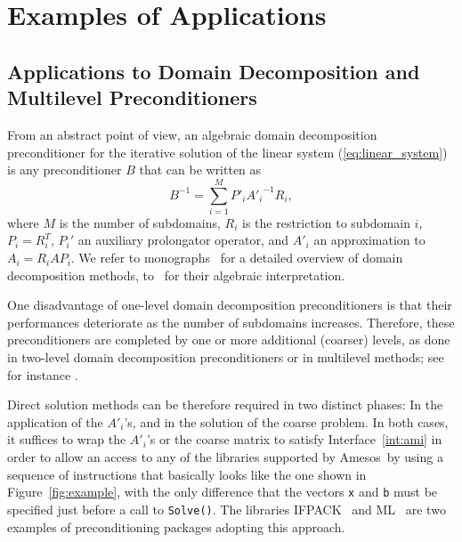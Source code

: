 \documentclass[acmtocl]{acmtrans2m}
\newcommand{\amesos}{{\sc Amesos}}
\begin{document}
\section{Examples of Applications}
\label{sec:example}

\subsection{Applications to Domain Decomposition and Multilevel Preconditioners}
\label{sec:preconditioner}

From an abstract point of view, an algebraic domain decomposition
preconditioner for the iterative solution of the linear system
(\ref{eq:linear_system})
is any preconditioner $B$ that can be written as
\begin{equation}
\label{eq:prec}
B^{-1} = \sum_{i=1}^M P'_i {A'_i}^{-1} R_i,
\end{equation}
where
$M$ is the number of subdomains, $R_i$ is the restriction to subdomain $i$,
  $P_i = R_i^T$, $P_i'$ an auxiliary prolongator operator, and 
$A'_i$ an approximation to $A_i = R_i A P_i$.  We refer to 
monographs~\cite{QV2,smith96parallel} for a detailed
overview of domain decomposition methods, to~\cite{saad96iterative} for their
algebraic interpretation.

One disadvantage of one-level domain decomposition preconditioners is that
their performances deteriorate as the number of subdomains increases.
Therefore, these preconditioners are completed by one or more additional
(coarser) levels, as done in two-level domain decomposition preconditioners or
in multilevel methods; 
see for instance \cite{brandt.classic,hack.book}. 

Direct solution methods can be therefore required in two distinct phases: In the application of
the $A'_i$'s, and in the solution of the coarse problem. In both cases, it
suffices to wrap the $A'_i$'s or the coarse matrix to satisfy
Interface~\ref{int:ami} in order to allow an access to any of the libraries
supported by \amesos\ by using a sequence of instructions that basically looks
like the one shown in Figure~\ref{fig:example}, with the only difference that
the vectors \verb!x! and \verb!b! must be specified just before a call to
\verb!Solve()!.  The libraries IFPACK~\cite{ifpack-guide} and
ML~\cite{ml-guide} are two examples of preconditioning packages adopting this
approach.
\end{document}
